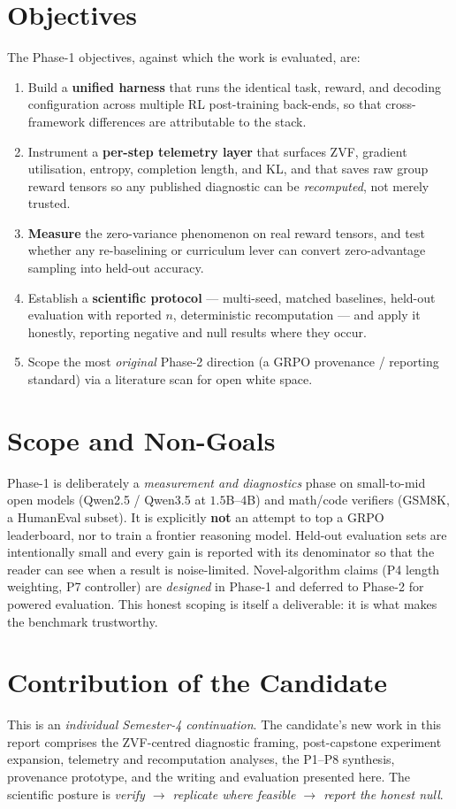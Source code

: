 \documentclass[12pt,a4paper]{report}
\begin{document}
\section{Objectives}
The Phase-1 objectives, against which the work is evaluated, are:
\begin{enumerate}[leftmargin=1.6em,itemsep=2pt]
  \item Build a \textbf{unified harness} that runs the identical task, reward, and
  decoding configuration across multiple RL post-training back-ends, so that
  cross-framework differences are attributable to the stack.
  \item Instrument a \textbf{per-step telemetry layer} that surfaces ZVF, gradient
  utilisation, entropy, completion length, and KL, and that saves raw group reward
  tensors so any published diagnostic can be \emph{recomputed}, not merely trusted.
  \item \textbf{Measure} the zero-variance phenomenon on real reward tensors, and
  test whether any re-baselining or curriculum lever can convert zero-advantage
  sampling into held-out accuracy.
  \item Establish a \textbf{scientific protocol} --- multi-seed, matched baselines,
  held-out evaluation with reported $n$, deterministic recomputation --- and apply it
  honestly, reporting negative and null results where they occur.
  \item Scope the most \emph{original} Phase-2 direction (a GRPO provenance /
  reporting standard) via a literature scan for open white space.
\end{enumerate}

\section{Scope and Non-Goals}
Phase-1 is deliberately a \emph{measurement and diagnostics} phase on small-to-mid
open models (Qwen2.5 / Qwen3.5 at $1.5$B--$4$B) and math/code verifiers (GSM8K,
a HumanEval subset). It is explicitly \textbf{not} an attempt to top a GRPO
leaderboard, nor to train a frontier reasoning model. Held-out evaluation sets are
intentionally small and every gain is reported with its denominator so that the
reader can see when a result is noise-limited. Novel-algorithm claims (P4 length
weighting, P7 controller) are \emph{designed} in Phase-1 and deferred to Phase-2
for powered evaluation. This honest scoping is itself a deliverable: it is what
makes the benchmark trustworthy.

\section{Contribution of the Candidate}
\label{sec:contribution}
This is an \emph{individual Semester-4 continuation}. The candidate's new work in
this report comprises the ZVF-centred diagnostic framing, post-capstone experiment
expansion, telemetry and recomputation analyses, the P1--P8 synthesis, provenance
prototype, and the writing and evaluation presented here. The scientific posture is
\emph{verify $\rightarrow$ replicate where feasible $\rightarrow$ report the honest
null}.
\end{document}
